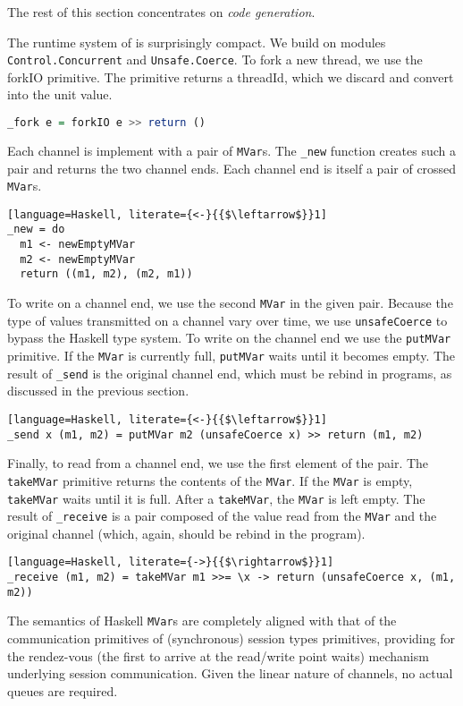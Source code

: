 The rest of this section concentrates on \emph{code generation}.

The runtime system of \freest{} is surprisingly compact. We build on
modules \lstinline|Control.Concurrent| and
\lstinline|Unsafe.Coerce|.
%
To fork a new thread, we use the forkIO primitive. The primitive
returns a threadId, which we discard and convert into the unit value.
%
\begin{lstlisting}[language=Haskell]
_fork e = forkIO e >> return ()
\end{lstlisting}

Each channel is implement with a pair of \lstinline|MVar|s. The
\lstinline|_new| function creates such a pair and returns the two
channel ends. Each channel end is itself a pair of crossed
\lstinline|MVar|s.
%
\begin{lstlisting}[language=Haskell, literate={<-}{{$\leftarrow$}}1]
_new = do
  m1 <- newEmptyMVar
  m2 <- newEmptyMVar
  return ((m1, m2), (m2, m1))
\end{lstlisting}

To write on a channel end, we use the second \lstinline|MVar| in the
given pair. Because the type of values transmitted on a channel vary
over time, we use \lstinline|unsafeCoerce| to bypass the Haskell type
system. To write on the channel end we use the \lstinline|putMVar|
primitive. If the \lstinline|MVar| is currently full,
\lstinline|putMVar| waits until it becomes empty.  The result of
\lstinline|_send| is the original channel end, which must be rebind in
programs, as discussed in the previous section.
%
\begin{lstlisting}[language=Haskell, literate={<-}{{$\leftarrow$}}1]
_send x (m1, m2) = putMVar m2 (unsafeCoerce x) >> return (m1, m2)
\end{lstlisting}

Finally, to read from a channel end, we use the first element of the
pair. The \lstinline|takeMVar| primitive returns the contents of the
\lstinline|MVar|. If the \lstinline|MVar| is empty,
\lstinline|takeMVar| waits until it is full. After a
\lstinline|takeMVar|, the \lstinline|MVar| is left empty. The result
of \lstinline|_receive| is a pair composed of the value read from the
\lstinline|MVar| and the original channel (which, again, should be
rebind in the program).
%
\begin{lstlisting}[language=Haskell, literate={->}{{$\rightarrow$}}1]
_receive (m1, m2) = takeMVar m1 >>= \x -> return (unsafeCoerce x, (m1, m2))
\end{lstlisting}

The semantics of Haskell \lstinline|MVar|s are completely aligned with
that of the communication primitives of (synchronous) session types
primitives, providing for the rendez-vous (the first to arrive at the
read/write point waits) mechanism underlying session
communication. Given the linear nature of \freest{} channels, no
actual queues are required.

